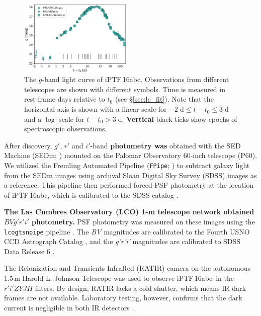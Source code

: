 \documentclass[twocolumn]{aastex61}
\newcommand{\abc}{iPTF\,16abc}
\begin{document}
\begin{figure}[htb] 
    \centering
    \includegraphics[width=0.48\textwidth]{logLC_with_colors.pdf} 
    \caption{
    The $g$-band light curve of \abc. Observations from different telescopes
    are shown with different symbols. Time is measured in rest-frame days
    relative to $t_0$ (see \S\ref{sec:lc_fit}). Note that the horizontal axis
    is shown with a linear scale for $-2 \; \mathrm{d} \le t - t_0 \le 3 \;
    \mathrm{d}$ and a $\log$ scale for $t - t_0 > 3 \; \mathrm{d}$.
    \textbf{Vertical} black ticks show epochs of spectroscopic observations. }
    \label{fig:lightcurve} 
\end{figure}

After discovery, $g'$, $r'$ and $i'$-band \textbf{photometry was} obtained
with the SED Machine (SEDm; \citealt{2017arXiv171002917B}) mounted on the
Palomar Observatory 60-inch telescope (P60). We utilized the Fremling
Automated Pipeline (\texttt{FPipe}; \citealt{2016A&A...593A..68F}) to subtract
galaxy light from the SEDm images using archival Sloan Digital Sky Survey
(SDSS) images as a reference. This pipeline then performed forced-PSF
photometry at the location of \abc, which is calibrated to the SDSS catalog
\citep{2014ApJS..211...17A}.

\textbf{The Las Cumbres Observatory (LCO) 1-m telescope network obtained
$BVg'r'i'$ photometry.} PSF photometry was measured on these images using the
\texttt{lcogtsnpipe} pipeline \citep{2016MNRAS.459.3939V}. The \textit{BV}
magnitudes are calibrated to the Fourth USNO CCD Astrograph Catalog
\citep{2013AJ....145...44Z}, and the \textit{g'r'i'} magnitudes are calibrated
to SDSS Data Release 6 \citep{2008ApJS..175..297A}.

The Reionization and Transients InfraRed (RATIR) camera on the autonomous
1.5\,m Harold L. Johnson Telescope
\citep{2012SPIE.8446E..10B,2012SPIE.8444E..5LW} was used to observe \abc\ in
the $r'i'ZYJH$ filters. By design, RATIR lacks a cold shutter, which means IR
dark frames are not available. Laboratory testing, however, confirms that the
dark current is negligible in both IR detectors \citep{2012SPIE.8453E..1OF}.
\end{document}
